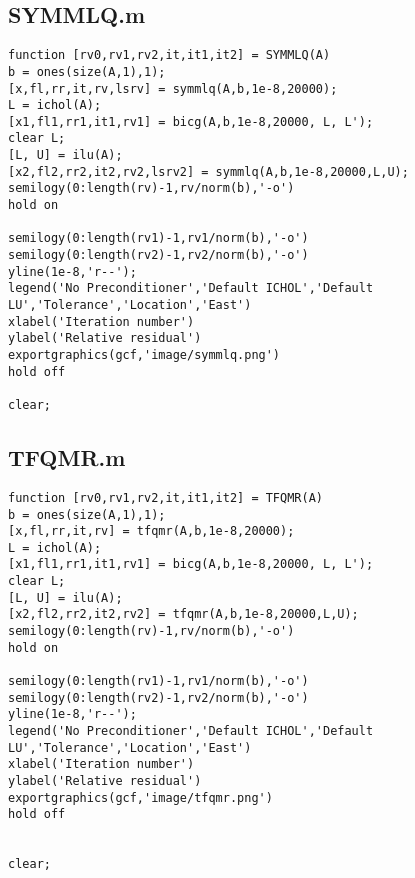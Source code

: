 \subsection*{SYMMLQ.m}

\begin{lstlisting}
function [rv0,rv1,rv2,it,it1,it2] = SYMMLQ(A)
b = ones(size(A,1),1);
[x,fl,rr,it,rv,lsrv] = symmlq(A,b,1e-8,20000);
L = ichol(A);
[x1,fl1,rr1,it1,rv1] = bicg(A,b,1e-8,20000, L, L');
clear L;
[L, U] = ilu(A);
[x2,fl2,rr2,it2,rv2,lsrv2] = symmlq(A,b,1e-8,20000,L,U);
semilogy(0:length(rv)-1,rv/norm(b),'-o')
hold on

semilogy(0:length(rv1)-1,rv1/norm(b),'-o')
semilogy(0:length(rv2)-1,rv2/norm(b),'-o')
yline(1e-8,'r--');
legend('No Preconditioner','Default ICHOL','Default LU','Tolerance','Location','East')
xlabel('Iteration number')
ylabel('Relative residual')
exportgraphics(gcf,'image/symmlq.png')
hold off

clear;
\end{lstlisting}

\subsection*{TFQMR.m}
\begin{lstlisting}
function [rv0,rv1,rv2,it,it1,it2] = TFQMR(A)
b = ones(size(A,1),1);
[x,fl,rr,it,rv] = tfqmr(A,b,1e-8,20000);
L = ichol(A);
[x1,fl1,rr1,it1,rv1] = bicg(A,b,1e-8,20000, L, L');
clear L;
[L, U] = ilu(A);
[x2,fl2,rr2,it2,rv2] = tfqmr(A,b,1e-8,20000,L,U);
semilogy(0:length(rv)-1,rv/norm(b),'-o')
hold on

semilogy(0:length(rv1)-1,rv1/norm(b),'-o')
semilogy(0:length(rv2)-1,rv2/norm(b),'-o')
yline(1e-8,'r--');
legend('No Preconditioner','Default ICHOL','Default LU','Tolerance','Location','East')
xlabel('Iteration number')
ylabel('Relative residual')
exportgraphics(gcf,'image/tfqmr.png')
hold off


clear;
\end{lstlisting}